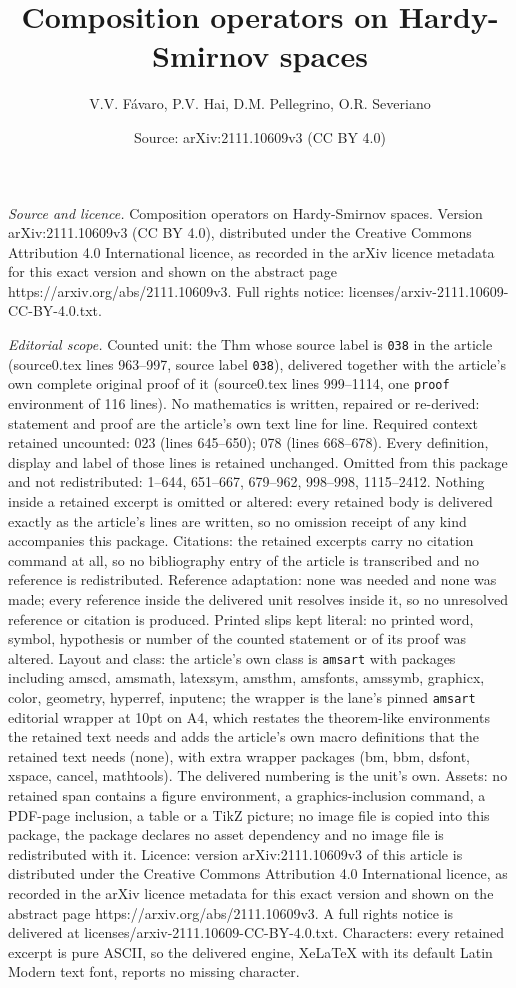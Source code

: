 \documentclass[10pt,a4paper]{amsart}
\title[Composition operators on Hardy-Smirnov spaces]{Composition operators on Hardy-Smirnov spaces}
\author{V.V. F\'avaro, P.V. Hai, D.M. Pellegrino, O.R. Severiano}
\date{Source: arXiv:2111.10609v3 (CC BY 4.0)}
\begin{document}
\maketitle

\noindent\emph{Source and licence.} Composition operators on Hardy-Smirnov spaces. Version arXiv:2111.10609v3 (CC BY 4.0), distributed under the Creative Commons Attribution 4.0 International licence, as recorded in the arXiv licence metadata for this exact version and shown on the abstract page https://arxiv.org/abs/2111.10609v3. Full rights notice: licenses/arxiv-2111.10609-CC-BY-4.0.txt.\par\smallskip

\noindent\textit{Editorial scope.} Counted unit: the Thm whose source label is \texttt{038} in the article (source0.tex lines 963--997, source label \texttt{038}), delivered together with the article's own complete original proof of it (source0.tex lines 999--1114, one \texttt{proof} environment of 116 lines). No mathematics is written, repaired or re-derived: statement and proof are the article's own text line for line. Required context retained uncounted: 023 (lines 645--650); 078 (lines 668--678). Every definition, display and label of those lines is retained unchanged. Omitted from this package and not redistributed: 1--644, 651--667, 679--962, 998--998, 1115--2412. Nothing inside a retained excerpt is omitted or altered: every retained body is delivered exactly as the article's lines are written, so no omission receipt of any kind accompanies this package. Citations: the retained excerpts carry no citation command at all, so no bibliography entry of the article is transcribed and no reference is redistributed. Reference adaptation: none was needed and none was made; every reference inside the delivered unit resolves inside it, so no unresolved reference or citation is produced. Printed slips kept literal: no printed word, symbol, hypothesis or number of the counted statement or of its proof was altered. Layout and class: the article's own class is \texttt{amsart} with packages including amscd, amsmath, latexsym, amsthm, amsfonts, amssymb, graphicx, color, geometry, hyperref, inputenc; the wrapper is the lane's pinned \texttt{amsart} editorial wrapper at 10pt on A4, which restates the theorem-like environments the retained text needs and adds the article's own macro definitions that the retained text needs (none), with extra wrapper packages (bm, bbm, dsfont, xspace, cancel, mathtools). The delivered numbering is the unit's own. Assets: no retained span contains a figure environment, a graphics-inclusion command, a PDF-page inclusion, a table or a TikZ picture; no image file is copied into this package, the package declares no asset dependency and no image file is redistributed with it. Licence: version arXiv:2111.10609v3 of this article is distributed under the Creative Commons Attribution 4.0 International licence, as recorded in the arXiv licence metadata for this exact version and shown on the abstract page https://arxiv.org/abs/2111.10609v3. A full rights notice is delivered at licenses/arxiv-2111.10609-CC-BY-4.0.txt. Characters: every retained excerpt is pure ASCII, so the delivered engine, XeLaTeX with its default Latin Modern text font, reports no missing character.
\end{document}
